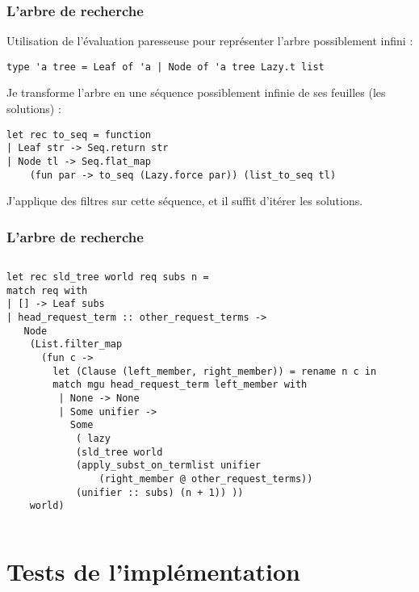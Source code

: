 \documentclass[aspectratio=43]{beamer}
\begin{document}
\begin{frame}[fragile]
  \frametitle{L'arbre de recherche}
  Utilisation de l'évaluation paresseuse pour représenter l'arbre possiblement infini :
\begin{verbatim}
type 'a tree = Leaf of 'a | Node of 'a tree Lazy.t list
\end{verbatim}

\vspace{1em}

Je transforme l'arbre en une séquence possiblement infinie de ses feuilles (les solutions) :

\begin{verbatim}
let rec to_seq = function
| Leaf str -> Seq.return str
| Node tl -> Seq.flat_map
    (fun par -> to_seq (Lazy.force par)) (list_to_seq tl)
\end{verbatim}

\vspace{1em}

J'applique des filtres sur cette séquence, et il suffit d'itérer les solutions.

\end{frame}

\begin{frame}[fragile]
  \frametitle{L'arbre de recherche}
\begin{columns}
\column{\dimexpr\paperwidth-40pt}
\begin{verbatim}
let rec sld_tree world req subs n =
match req with
| [] -> Leaf subs
| head_request_term :: other_request_terms ->
   Node
    (List.filter_map
      (fun c ->
        let (Clause (left_member, right_member)) = rename n c in
        match mgu head_request_term left_member with
         | None -> None
         | Some unifier ->
           Some
            ( lazy
            (sld_tree world
            (apply_subst_on_termlist unifier
                (right_member @ other_request_terms))
            (unifier :: subs) (n + 1)) ))
    world)
\end{verbatim}
\end{columns}
\end{frame}

\section{Tests de l'implémentation}
\end{document}
